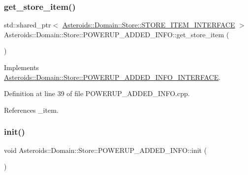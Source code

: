 \subsubsection{\texorpdfstring{get\+\_\+store\+\_\+item()}{get\_store\_item()}}
{\footnotesize\ttfamily std\+::shared\+\_\+ptr$<$ \hyperlink{classAsteroids_1_1Domain_1_1Store_1_1STORE__ITEM__INTERFACE}{Asteroids\+::\+Domain\+::\+Store\+::\+S\+T\+O\+R\+E\+\_\+\+I\+T\+E\+M\+\_\+\+I\+N\+T\+E\+R\+F\+A\+CE} $>$ Asteroids\+::\+Domain\+::\+Store\+::\+P\+O\+W\+E\+R\+U\+P\+\_\+\+A\+D\+D\+E\+D\+\_\+\+I\+N\+F\+O\+::get\+\_\+store\+\_\+item (\begin{DoxyParamCaption}{ }\end{DoxyParamCaption})\hspace{0.3cm}{\ttfamily [virtual]}}



Implements \hyperlink{classAsteroids_1_1Domain_1_1Store_1_1POWERUP__ADDED__INFO__INTERFACE_a239e4ca18858270bde9a876e2690ca88}{Asteroids\+::\+Domain\+::\+Store\+::\+P\+O\+W\+E\+R\+U\+P\+\_\+\+A\+D\+D\+E\+D\+\_\+\+I\+N\+F\+O\+\_\+\+I\+N\+T\+E\+R\+F\+A\+CE}.



Definition at line 39 of file P\+O\+W\+E\+R\+U\+P\+\_\+\+A\+D\+D\+E\+D\+\_\+\+I\+N\+F\+O.\+cpp.



References \+\_\+item.

\mbox{\label{classAsteroids_1_1Domain_1_1Store_1_1POWERUP__ADDED__INFO_ae3ef91a132b9a5f545d11630ef2466d4}} 
\subsubsection{\texorpdfstring{init()}{init()}}
{\footnotesize\ttfamily void Asteroids\+::\+Domain\+::\+Store\+::\+P\+O\+W\+E\+R\+U\+P\+\_\+\+A\+D\+D\+E\+D\+\_\+\+I\+N\+F\+O\+::init (\begin{DoxyParamCaption}{ }\end{DoxyParamCaption})\hspace{0.3cm}{\ttfamily [private]}}



